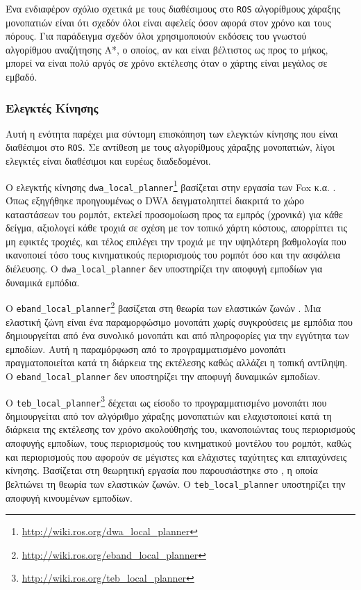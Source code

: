 Ένα ενδιαφέρον σχόλιο σχετικά με τους διαθέσιμους στο \texttt{ROS} αλγορίθμους
χάραξης μονοπατιών είναι ότι σχεδόν όλοι είναι αφελείς όσον αφορά στον χρόνο
και τους πόρους. Για παράδειγμα σχεδόν όλοι χρησιμοποιούν εκδόσεις του γνωστού
αλγορίθμου αναζήτησης A*, ο οποίος, αν και είναι βέλτιστος ως προς το μήκος,
μπορεί να είναι πολύ αργός σε χρόνο εκτέλεσης όταν ο χάρτης είναι μεγάλος σε
εμβαδό.

\subsubsection{Ελεγκτές Κίνησης}
\label{subsubsection:02_01_02:03_02}

Αυτή η ενότητα παρέχει μια σύντομη επισκόπηση των ελεγκτών κίνησης που είναι
διαθέσιμοι στο \texttt{ROS}. Σε αντίθεση με τους αλγορίθμους χάραξης
μονοπατιών, λίγοι ελεγκτές είναι διαθέσιμοι και ευρέως διαδεδομένοι.

Ο ελεγκτής κίνησης
\texttt{dwa\_local\_planner}\footnote{\url{http://wiki.ros.org/dwa\_local\_planner}}
βασίζεται στην εργασία των Fox κ.α. \cite{Fox1997}. Όπως εξηγήθηκε
προηγουμένως ο DWA δειγματοληπτεί διακριτά το χώρο καταστάσεων του ρομπότ,
εκτελεί προσομοίωση προς τα εμπρός (χρονικά) για κάθε δείγμα, αξιολογεί κάθε
τροχιά σε σχέση με τον τοπικό χάρτη κόστους, απορρίπτει τις μη εφικτές τροχιές,
και τέλος επιλέγει την τροχιά με την υψηλότερη βαθμολογία που ικανοποιεί τόσο
τους κινηματικούς περιορισμούς του ρομπότ όσο και την ασφάλεια διέλευσης. Ο
\texttt{dwa\_local\_planner} δεν υποστηρίζει την αποφυγή εμποδίων για δυναμικά
εμπόδια.

Ο
\texttt{eband\_local\_planner}\footnote{\url{http://wiki.ros.org/eband\_local\_planner}}
βασίζεται στη θεωρία των ελαστικών ζωνών \cite{Quinlan}. Μια ελαστική ζώνη
είναι ένα παραμορφώσιμο μονοπάτι χωρίς συγκρούσεις με εμπόδια που δημιουργείται
από ένα συνολικό μονοπάτι και από πληροφορίες για την εγγύτητα των εμποδίων.
Αυτή η παραμόρφωση από το προγραμματισμένο μονοπάτι πραγματοποιείται κατά τη
διάρκεια της εκτέλεσης καθώς αλλάζει η τοπική αντίληψη.  Ο
\texttt{eband\_local\_planner} δεν υποστηρίζει την αποφυγή δυναμικών εμποδίων.

Ο
\texttt{teb\_local\_planner}\footnote{\url{http://wiki.ros.org/teb\_local\_planner}}
δέχεται ως είσοδο το προγραμματισμένο μονοπάτι που δημιουργείται από τον
αλγόριθμο χάραξης μονοπατιών και ελαχιστοποιεί κατά τη διάρκεια της
εκτέλεσης τον χρόνο ακολούθησής του, ικανοποιώντας τους περιορισμούς
αποφυγής εμποδίων, τους περιορισμούς του κινηματικού μοντέλου του ρομπότ, καθώς
και περιορισμούς που αφορούν σε μέγιστες και ελάχιστες ταχύτητες και
επιταχύνσεις κίνησης.  Βασίζεται στη θεωρητική εργασία που παρουσιάστηκε στο
\cite{Rosmann2017}, η οποία βελτιώνει τη θεωρία των ελαστικών ζωνών. Ο
\texttt{teb\_local\_planner} υποστηρίζει την αποφυγή κινουμένων εμποδίων.
